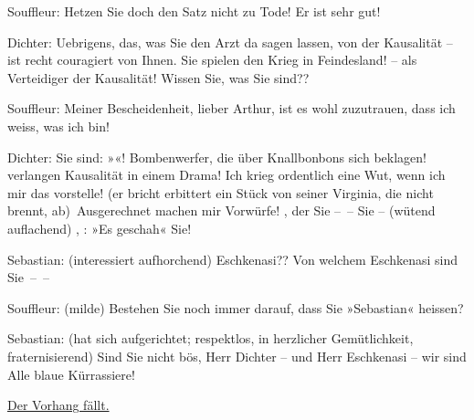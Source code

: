 \pstart
           Souffleur: Hetzen Sie doch den Satz nicht zu Tode! Er ist sehr gut!\pend
           
\pstart
           Dichter: Uebrigens, das, was Sie den Arzt da sagen lassen, von der Kausalität – ist
               recht couragiert von Ihnen. Sie spielen den Krieg in Feindesland!  – als Verteidiger der Kausalität! Wissen Sie, was Sie
               sind??\pend
           
\pstart
           Souffleur: Meiner Bescheiden\introOben{}heit\introOben{}, lieber Arthur, ist es wohl
               zuzutrauen, dass ich weiss, was ich bin!\pend
           
\pstart
           Dichter: Sie sind: »\label{K_L01900-3v}\label{K_L01900-3}«! Bombenwerfer, die über Knallbonbons sich beklagen!  verlangen Kausalität in einem Drama! Ich krieg
               ordentlich eine Wut, wenn ich mir das vorstelle! (er bricht erbittert ein Stück von
               seiner Virginia, die nicht brennt, ab) Ausgerechnet 
               machen mir Vorwürfe! {\pb}, der Sie – – Sie – (wütend auflachend) , : »Es geschah« Sie!\pend
           
\pstart
           Sebastian: (interessiert aufhorchend) Eschkenasi?? Von welchem Eschkenasi sind
               Sie – –\pend
           
\pstart
           Souffleur: (milde) Bestehen Sie noch immer darauf, dass Sie  »Sebastian« heissen?\pend
           
\pstart
           Sebastian: (hat sich aufgerichtet; respektlos, in herzlicher Gemütlichkeit,
               fraternisierend) Sind Sie nicht bös, Herr Dichter – und Herr Eschkenasi – wir sind
               Alle blaue Kürrassiere!\pend
           
\pstart
           \centering{}\uline{Der Vorhang fällt.}\pend
           \endnumbering{}  
      
